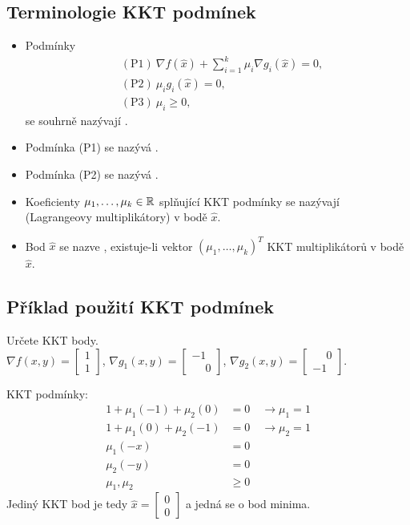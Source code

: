 \subsection{Terminologie KKT podmínek}
\begin{itemize}
    \item Podmínky
    \begin{align*}
        &(\text{P}1) \: \nabla f(\hat x) + \sum_{i=1}^{k}\mu_i \nabla g_i(\hat x) = 0, \\
        &(\text{P}2) \: \mu_i g_i(\hat x) = 0, \\
        &(\text{P}3) \: \mu_i \geq 0,
    \end{align*}
    se souhrně nazývají .
    \item Podmínka (P1) se nazývá .
    \item Podmínka (P2) se nazývá .
    \item Koeficienty $\mu_1, \dots, \mu_k \in \mathbb{R}$ splňující KKT podmínky se nazývají  
    \\ (Lagrangeovy multiplikátory) v bodě $\hat x$.
    \item Bod $\hat x$ se nazve , existuje-li vektor $(\mu_1, \dots, \mu_k)^T$ KKT multiplikátorů v bodě 
    $\hat x$.
\end{itemize}

\subsection{Příklad použití KKT podmínek}
Určete KKT body.\\
$\nabla f(x, y) = 
\begin{bmatrix}
    1 \\
    1
\end{bmatrix}$, $\nabla g_1(x,y) = 
\begin{bmatrix}
    -1 \\
    \phantom{-}0
\end{bmatrix}$, $\nabla g_2(x,y) = 
\begin{bmatrix}
    \phantom{-}0 \\
    -1
\end{bmatrix}$.

KKT podmínky:
\begin{align*}
    1 + \mu_1 (-1) + \mu_2 (0)  &= 0 \quad \rightarrow \mu_1 = 1 \\
    1 + \mu_1 (0) +  \mu_2 (-1) &= 0 \quad \rightarrow \mu_2 = 1 \\
    \mu_1 (-x) &= 0 \\
    \mu_2 (-y) &= 0 \\
    \mu_1, \mu_2 &\geq 0
\end{align*}
Jediný KKT bod je tedy 
$\hat x = \begin{bmatrix}
    0 \\
    0
\end{bmatrix}$ a jedná se o bod minima.

